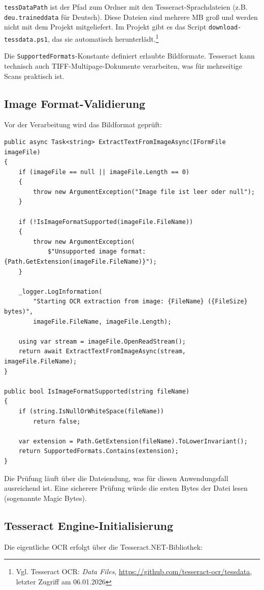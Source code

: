 \texttt{tessDataPath} ist der Pfad zum Ordner mit den Tesseract-Sprachdateien (z.B. \texttt{deu.traineddata} für Deutsch). Diese Dateien sind mehrere MB groß und werden nicht mit dem Projekt mitgeliefert. Im Projekt gibt es das Script \texttt{download-tessdata.ps1}, das sie automatisch herunterlädt.\footnote{Vgl. Tesseract OCR: \textit{Data Files}, \url{https://github.com/tesseract-ocr/tessdata}, letzter Zugriff am 06.01.2026}

Die \texttt{SupportedFormats}-Konstante definiert erlaubte Bildformate. Tesseract kann technisch auch TIFF-Multipage-Dokumente verarbeiten, was für mehrseitige Scans praktisch ist.

\subsection{Image Format-Validierung}
Vor der Verarbeitung wird das Bildformat geprüft:

\begin{lstlisting}[language={[Sharp]C}, caption={Format-Validierung}, label={lst:image_validation}]
public async Task<string> ExtractTextFromImageAsync(IFormFile imageFile)
{
    if (imageFile == null || imageFile.Length == 0)
    {
        throw new ArgumentException("Image file ist leer oder null");
    }

    if (!IsImageFormatSupported(imageFile.FileName))
    {
        throw new ArgumentException(
            $"Unsupported image format: {Path.GetExtension(imageFile.FileName)}");
    }

    _logger.LogInformation(
        "Starting OCR extraction from image: {FileName} ({FileSize} bytes)", 
        imageFile.FileName, imageFile.Length);

    using var stream = imageFile.OpenReadStream();
    return await ExtractTextFromImageAsync(stream, imageFile.FileName);
}

public bool IsImageFormatSupported(string fileName)
{
    if (string.IsNullOrWhiteSpace(fileName))
        return false;

    var extension = Path.GetExtension(fileName).ToLowerInvariant();
    return SupportedFormats.Contains(extension);
}
\end{lstlisting}

Die Prüfung läuft über die Dateiendung, was für diesen Anwendungsfall ausreichend ist. Eine sicherere Prüfung würde die ersten Bytes der Datei lesen (sogenannte Magic Bytes).

\subsection{Tesseract Engine-Initialisierung}
Die eigentliche OCR erfolgt über die Tesseract.NET-Bibliothek:

